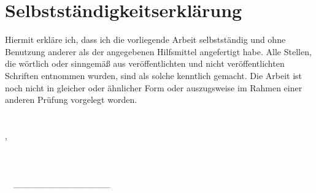 %
%

\chapter*{Selbstständigkeitserklärung}

Hiermit erkläre ich, dass ich die vorliegende Arbeit selbstständig und ohne Benutzung anderer als der angegebenen Hilfsmittel angefertigt habe.
Alle Stellen, die wörtlich oder sinngemäß aus veröffentlichten und nicht veröffentlichten Schriften
entnommen wurden, sind als solche kenntlich gemacht. Die Arbeit ist noch nicht in
gleicher oder ähnlicher Form oder auszugsweise im Rahmen einer anderen Prüfung
vorgelegt worden.
\\
\\
\\
\hspace*{\fill}\cfgAuthorCity, \cfgDateLastModification
\\
\\
\\
\\
\hspace*{\fill}\cfgAuthorName\ \ \_\_\_\_\_\_\_\_\_\_\_\_\_\_\_
